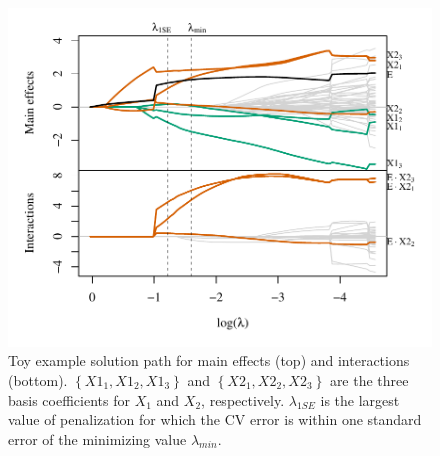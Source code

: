 \begin{knitrout}\scriptsize
{}\color{fgcolor}\begin{figure}[H]

{\centering \includegraphics[width=1\linewidth]{figure/toy-solution-path-1} 

}

\caption[Toy example solution path for main effects (top) and interactions (bottom)]{Toy example solution path for main effects (top) and interactions (bottom). $\left\lbrace X1_1, X1_2, X1_3 \right\rbrace$ and $\left\lbrace X2_1, X2_2, X2_3 \right\rbrace$ are the three basis coefficients for $X_1$ and $X_2$, respectively. $\lambda_{1SE}$ is the largest value of penalization for which the CV error is within one standard error of the minimizing value $\lambda_{min}$.}\label{fig:toy-solution-path}
\end{figure}
\end{knitrout}

